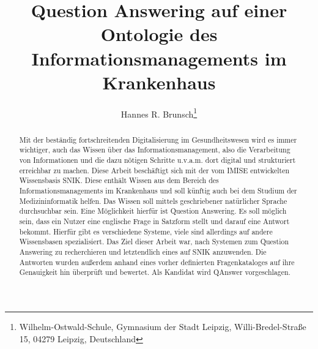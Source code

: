 \documentclass[utf8,biblatex]{lni}
\begin{document}
\title[Question Answering auf SNIK]{Question Answering auf einer Ontologie des Informationsmanagements im Krankenhaus}
\author[Hannes R. Brunsch]%
{Hannes R. Brunsch\footnote{Wilhelm-Ostwald-Schule, Gymnasium der Stadt Leipzig, Willi-Bredel-Straße 15, 04279 Leipzig, Deutschland }}
\maketitle

\begin{abstract}
Mit der beständig fortschreitenden Digitalisierung im Gesundheitswesen wird es immer wichtiger, auch das Wissen über das Informationsmanagement,
also die Verarbeitung von Informationen und die dazu nötigen Schritte u.v.a.m. dort digital und strukturiert erreichbar zu machen.
Diese Arbeit beschäftigt sich mit der vom IMISE entwickelten Wissensbasis SNIK.
Diese enthält Wissen aus dem Bereich des Informationsmanagements im Krankenhaus und soll künftig auch bei dem Studium der Medizininformatik helfen.
Das Wissen soll mittels geschriebener natürlicher Sprache durchsuchbar sein.
Eine Möglichkeit hierfür ist Question Answering.
Es soll möglich sein, dass ein Nutzer eine englische Frage in Satzform stellt und darauf eine Antwort bekommt.
Hierfür gibt es verschiedene Systeme, viele sind allerdings auf andere Wissensbasen spezialisiert.
Das Ziel dieser Arbeit war, nach Systemen zum Question Answering zu recherchieren und letztendlich eines auf SNIK anzuwenden.
Die Antworten wurden außerdem anhand eines vorher definierten Fragenkataloges auf ihre Genauigkeit hin überprüft und bewertet.
Als Kandidat wird QAnswer vorgeschlagen.  
\end{abstract}

\end{document}
